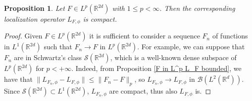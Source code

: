 \documentclass[corpo=11pt, stile=classica, tipotesi=custom,
greek, evenboxes, english]{toptesi}
\numberwithin{equation}{chapter}
\newtheorem{prop}[teo]{Proposition}
\theoremstyle{remark}
\newcommand{\R}{\mathbb{R}} %
\newcommand{\B}{\mathscr{B}} %
\begin{document}
\begin{prop}\label{F in L^p L_F compact}
	Let $F \in L^p(\R^{2d})$ with $1 \leq p < \infty$. Then the corresponding localization operator $L_{F,\phi}$ is compact.
\end{prop}
\begin{proof}
	Given $F \in L^p(\R^{2d})$ it is sufficient to consider a sequence $F_n$ of functions in $L^1(\R^{2d})$ such that $F_n \rightarrow F$ in $L^p(\R^{2d})$. For example, we can suppose that $F_n$ are in Schwartz's class $\mathcal{S}(\R^{2d})$, which is a well-known dense subspace of $L^p(\R^{2d})$ for $p < +\infty$. Indeed, from Proposition \ref{F in L^p L_F bounded}, we have that $\| L_{F_n,\phi} - L_{F,\phi}\| \leq \|F_n - F\|_p$, so $L_{F_n,\phi} \rightarrow L_{F,\phi}$ in $\B(L^2(\R^d))$. Since $\mathcal{S}(\R^{2d}) \subset L^1(\R^{2d})$, $L_{F_n,\phi}$ are compact, thus also $L_{F,\phi}$ is.
\end{proof}
\end{document}
